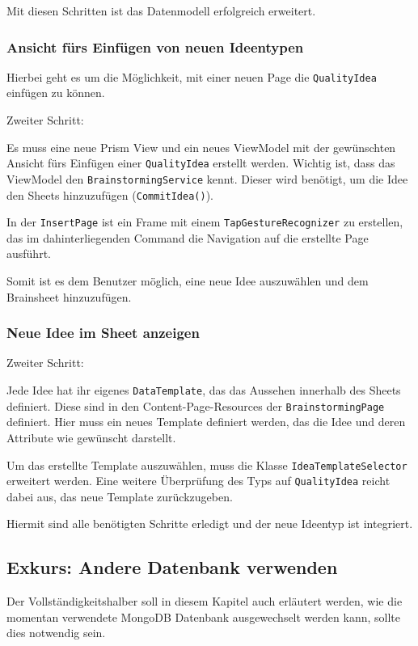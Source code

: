 Mit diesen Schritten ist das Datenmodell erfolgreich erweitert.

\subsubsection{Ansicht fürs Einfügen von neuen Ideentypen}
Hierbei geht es um die Möglichkeit, mit einer neuen Page die \texttt{QualityIdea} einfügen zu können.

\begin{labeling}{Zweiter Schritt:}
	\item[Erster Schritt:]	Es muss eine neue Prism View und ein neues ViewModel mit der gewünschten Ansicht fürs Einfügen einer \texttt{QualityIdea} erstellt werden. Wichtig ist, dass das ViewModel den \texttt{Brainstorming\-Service} kennt. Dieser wird benötigt, um die Idee den Sheets hinzuzufügen (\texttt{Commit\-Idea()}). 
	\item[Zweiter Schritt:] In der \texttt{InsertPage} ist ein Frame mit einem \texttt{TapGestureRecognizer} zu erstellen, das im dahinterliegenden Command die Navigation auf die erstellte Page ausführt.
\end{labeling}

Somit ist es dem Benutzer möglich, eine neue Idee auszuwählen und dem Brainsheet hinzuzufügen. 

\subsubsection{Neue Idee im Sheet anzeigen}
\begin{labeling}{Zweiter Schritt:}
	\item[Erster Schritt:] Jede Idee hat ihr eigenes \texttt{DataTemplate}, das das Aussehen innerhalb des Sheets definiert. Diese sind in den Content-Page-Resources der \texttt{Brain\-storming\-Page} definiert. Hier muss ein neues Template definiert werden, das die Idee und deren Attribute wie gewünscht darstellt. 
	\item[Zweiter Schritt:] Um das erstellte Template auszuwählen, muss die Klasse \texttt{Idea\-Template\-Selector} erweitert werden. Eine weitere Überprüfung des Typs auf \texttt{Qua\-lity\-Idea} reicht dabei aus, das neue Template zurückzugeben.
\end{labeling}

Hiermit sind alle benötigten Schritte erledigt und der neue Ideentyp ist integriert. 

\subsection{Exkurs: Andere Datenbank verwenden}
Der Vollständigkeitshalber soll in diesem Kapitel auch erläutert werden, wie die momentan verwendete MongoDB Datenbank ausgewechselt werden kann, sollte dies notwendig sein.


